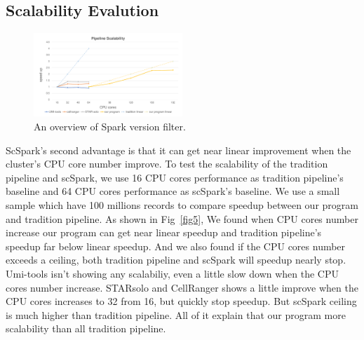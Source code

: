 \documentclass[conference]{IEEEtran}
\begin{document}
\subsection{Scalability Evalution}
\begin{figure}
  \includegraphics[width=0.5\textwidth]{fig4.pdf}
  \caption{An overview of Spark version filter.} \label{fig4}
\end{figure}
ScSpark's second advantage is that it can get near linear improvement when the cluster's CPU core number improve. 
To test the scalability of the tradition pipeline and scSpark, we use 16 CPU cores performance as tradition pipeline's baseline and 64 CPU cores performance as scSpark's baseline. 
We use a small sample which have 100 millions records to compare speedup between our program and tradition pipeline. 
As shown in Fig~\ref{fig5}, We found when CPU cores number increase our program can get near linear speedup and tradition pipeline's speedup far below linear speedup. 
And we also found if the CPU cores number exceeds a ceiling, both tradition pipeline and scSpark will speedup nearly stop. 
Umi-tools isn't showing any scalabiliy, even a little slow down when the CPU cores number increase. 
STARsolo and CellRanger shows a little improve when the CPU cores increases to 32 from 16, but quickly stop speedup. 
But scSpark ceiling is much higher than tradition pipeline. 
All of it explain that our program more scalability than all tradition pipeline. 
\end{document}
